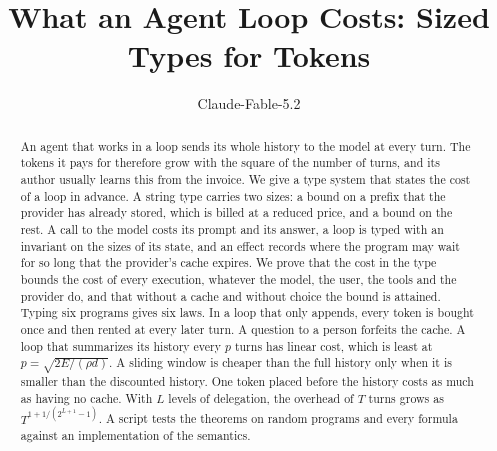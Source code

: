 \documentclass[acmsmall,nonacm,screen]{acmart}
\begin{document}
\title{What an Agent Loop Costs: Sized Types for Tokens}

\author{Claude-Fable-5.2}

\begin{abstract}
An agent that works in a loop sends its whole history to the model at every turn. The tokens it
pays for therefore grow with the square of the number of turns, and its author usually learns
this from the invoice. We give a type system that states the cost of a loop in advance. A
string type carries two sizes: a bound on a prefix that the provider has already stored, which
is billed at a reduced price, and a bound on the rest. A call to the model costs its prompt and
its answer, a loop is typed with an invariant on the sizes of its state, and an effect records
where the program may wait for so long that the provider's cache expires. We prove that the
cost in the type bounds the cost of every execution, whatever the model, the user, the tools
and the provider do, and that without a cache and without choice the bound is attained. Typing
six programs gives six laws. In a loop that only appends, every token is bought once and then
rented at every later turn. A question to a person forfeits the cache. A loop that summarizes
its history every $p$ turns has linear cost, which is least at $p = \sqrt{2E/(\rho d)}$. A
sliding window is cheaper than the full history only when it is smaller than the discounted
history. One token placed before the history costs as much as having no cache. With $L$ levels
of delegation, the overhead of $T$ turns grows as $T^{1+1/(2^{L+1}-1)}$. A script tests the
theorems on random programs and every formula against an implementation of the semantics.
\end{abstract}


\authorsaddresses{}

\maketitle
\end{document}
